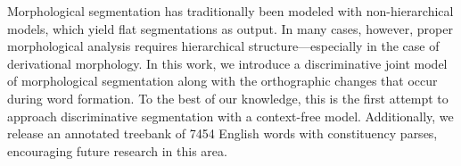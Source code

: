 Morphological segmentation has traditionally been modeled with non-hierarchical models, which yield flat segmentations as output. In many cases, however, proper morphological analysis requires hierarchical structure---especially in the case of derivational morphology. In this work, we introduce a discriminative joint model of morphological segmentation along with the orthographic changes that occur during word formation. To the best of our knowledge, this is the first attempt to approach discriminative segmentation with a context-free model. Additionally, we release an annotated treebank of 7454 English words with constituency parses, encouraging future research in this area.
